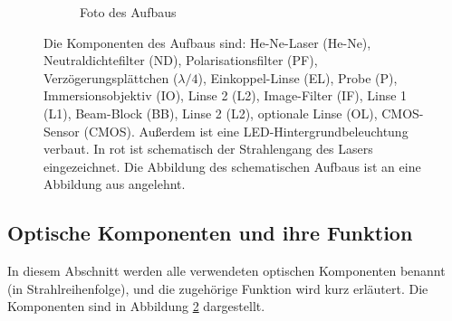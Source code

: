 \documentclass[a4paper, titlepage,  ngerman, fullpage]{book}
\begin{document}
\begin{figure}
\begin{subfigure}{0.9\textwidth}
			\caption{Foto des Aufbaus}
			\label{fig:aufsicht_aufbau_anotated}
		\end{subfigure}
		\caption[Versuchsaufbau]{Die Komponenten des Aufbaus sind: He-Ne-Laser (He-Ne), Neutraldichtefilter (ND), Polarisationsfilter (PF), Verzögerungsplättchen ($\lambda/4$), Einkoppel-Linse (EL), Probe (P), Immersionsobjektiv (IO), Linse 2 (L2), Image-Filter (IF), Linse 1 (L1), Beam-Block (BB), Linse 2 (L2), optionale Linse (OL), CMOS-Sensor (CMOS). Außerdem ist eine LED-Hintergrundbeleuchtung verbaut. In rot ist schematisch der Strahlengang des Lasers eingezeichnet. Die Abbildung des schematischen Aufbaus ist an eine Abbildung aus \cite{Jaruschewski.2020} angelehnt.}
		\label{fig:Aufbau}
	\end{figure}
	\subsection{Optische Komponenten und ihre Funktion}
		In diesem Abschnitt werden alle verwendeten optischen Komponenten benannt (in Strahlreihenfolge), und die zugehörige Funktion wird kurz erläutert. Die Komponenten sind in Abbildung \ref{fig:Aufbau} dargestellt.
\end{document}
